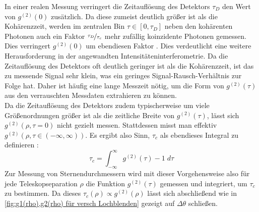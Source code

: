 In einer realen Messung verringert die Zeitauflösung des Detektors $\tau_D$ den Wert von $g^{(2)}(0)$ zusätzlich. 
Da diese zumeist deutlich größer ist als die Kohärenzzeit, werden im zentralen Bin $\tau \in [0, \tau_D]$ neben den kohärenten Photonen auch ein Faktor $\nicefrac{\tau_D}{\tau_c}$ mehr zufällig koinzidente Photonen gemessen. 
Dies verringert $g^{(2)}(0)$ um ebendiesen Faktor \cite[Kap. 14.7]{mandelOpticalCoherenceQuantum1995}. 
Dies verdeutlicht eine weitere Herausforderung in der angewandten Intensitäteninterferometrie. 
Da die Zeitauflösung des Detektors oft deutlich geringer ist als die Kohärenzzeit, ist das zu messende Signal sehr klein, was ein geringes Signal-Rausch-Verhältnis zur Folge hat. 
Daher ist häufig eine lange Messzeit nötig, um die Form von $g^{(2)}(\tau)$ aus den verrauschten Messdaten extrahieren zu können. \\
Da die Zeitauflösung des Detektors zudem typischerweise um viele Größenordnungen größer ist als die zeitliche Breite von $g^{(2)}(\tau)$, lässt sich $g^{(2)}(\rho, \tau=0)$ nicht gezielt messen. 
Stattdessen misst man effektiv $g^{(2)}(\rho, \tau\in(-\infty, \infty))$. 
Es ergibt also Sinn, $\tau_c$ als ebendieses Integral zu definieren \cite[Eq. 14.7-2]{mandelOpticalCoherenceQuantum1995}: 
\begin{equation}
    \tau_c = \int_{-\infty}^{\infty} g^{(2)}(\tau) - 1\;d\tau
\end{equation}
Zur Messung von Sternendurchmessern wird mit dieser Vorgehensweise also für jede Teleskopseparation $\rho$ die Funktion $g^{(2)}(\tau)$ gemessen und integriert, um $\tau_c$ zu bestimmen. 
Da dieses $\tau_c(\rho)\propto g^{(2)}(\rho)$ lässt sich abschließend wie in \autoref{fig:g1(rho),g2(rho) für versch Lochblenden} gezeigt auf $\Delta\theta$ schließen. 
